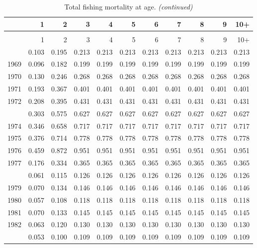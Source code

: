 \documentclass[
]{article}
\begin{document}
\begin{longtable}[t]{lrrrrrrrrrr}
\caption{\label{tab:FAA-tot-table}Total fishing mortality at age.}\\
\toprule
  & 1 & 2 & 3 & 4 & 5 & 6 & 7 & 8 & 9 & 10+\\
\midrule
\endfirsthead
\caption[]{Total fishing mortality at age. \textit{(continued)}}\\
\toprule
  & 1 & 2 & 3 & 4 & 5 & 6 & 7 & 8 & 9 & 10+\\
\midrule
\endhead

\endfoot
\bottomrule
\endlastfoot
1968 & 0.103 & 0.195 & 0.213 & 0.213 & 0.213 & 0.213 & 0.213 & 0.213 & 0.213 & 0.213\\
1969 & 0.096 & 0.182 & 0.199 & 0.199 & 0.199 & 0.199 & 0.199 & 0.199 & 0.199 & 0.199\\
1970 & 0.130 & 0.246 & 0.268 & 0.268 & 0.268 & 0.268 & 0.268 & 0.268 & 0.268 & 0.268\\
1971 & 0.193 & 0.367 & 0.401 & 0.401 & 0.401 & 0.401 & 0.401 & 0.401 & 0.401 & 0.401\\
1972 & 0.208 & 0.395 & 0.431 & 0.431 & 0.431 & 0.431 & 0.431 & 0.431 & 0.431 & 0.431\\
\addlinespace
1973 & 0.303 & 0.575 & 0.627 & 0.627 & 0.627 & 0.627 & 0.627 & 0.627 & 0.627 & 0.627\\
1974 & 0.346 & 0.658 & 0.717 & 0.717 & 0.717 & 0.717 & 0.717 & 0.717 & 0.717 & 0.717\\
1975 & 0.376 & 0.714 & 0.778 & 0.778 & 0.778 & 0.778 & 0.778 & 0.778 & 0.778 & 0.778\\
1976 & 0.459 & 0.872 & 0.951 & 0.951 & 0.951 & 0.951 & 0.951 & 0.951 & 0.951 & 0.951\\
1977 & 0.176 & 0.334 & 0.365 & 0.365 & 0.365 & 0.365 & 0.365 & 0.365 & 0.365 & 0.365\\
\addlinespace
1978 & 0.061 & 0.115 & 0.126 & 0.126 & 0.126 & 0.126 & 0.126 & 0.126 & 0.126 & 0.126\\
1979 & 0.070 & 0.134 & 0.146 & 0.146 & 0.146 & 0.146 & 0.146 & 0.146 & 0.146 & 0.146\\
1980 & 0.057 & 0.108 & 0.118 & 0.118 & 0.118 & 0.118 & 0.118 & 0.118 & 0.118 & 0.118\\
1981 & 0.070 & 0.133 & 0.145 & 0.145 & 0.145 & 0.145 & 0.145 & 0.145 & 0.145 & 0.145\\
1982 & 0.063 & 0.120 & 0.130 & 0.130 & 0.130 & 0.130 & 0.130 & 0.130 & 0.130 & 0.130\\
\addlinespace
1983 & 0.053 & 0.100 & 0.109 & 0.109 & 0.109 & 0.109 & 0.109 & 0.109 & 0.109 & 0.109\\

\end{longtable}
\end{document}
